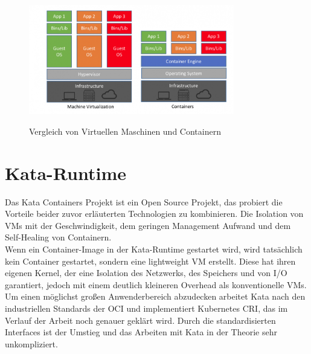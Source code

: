 \begin{figure}[ht]
        \caption{Vergleich von Virtuellen Maschinen und Containern\cite{vm_vs_container}}
        \centering
        \includegraphics[width=0.8\textwidth]{bilder/comparison_vm_container.png}
        \label{fig:comparison_vm_container}
\end{figure}


\section{Kata-Runtime}
Das Kata Containers Projekt ist ein Open Source Projekt, das probiert die Vorteile beider zuvor erläuterten Technologien zu kombinieren.
Die Isolation von \ac{VM}s mit der Geschwindigkeit, dem geringen Management Aufwand und dem Self-Healing von Containern.
\\
Wenn ein Container-Image in der Kata-Runtime gestartet wird, wird tatsächlich kein Container gestartet, sondern eine lightweight \ac{VM} erstellt.
Diese hat ihren eigenen Kernel, der eine Isolation des Netzwerks, des Speichers und von \ac{I/O} garantiert, jedoch mit einem deutlich kleineren Overhead als konventionelle \ac{VM}s.
Um einen möglichst großen Anwenderbereich abzudecken arbeitet Kata nach den industriellen Standards der \ac{OCI} und implementiert Kubernetes \ac{CRI}, das im Verlauf der Arbeit noch genauer geklärt wird. 
Durch die standardisierten Interfaces ist der Umstieg und das Arbeiten mit Kata in der Theorie sehr unkompliziert. \cite{kata}

